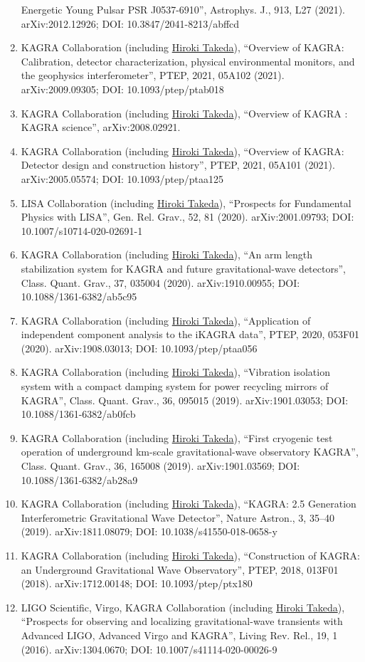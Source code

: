 \documentclass[uplatex, 11pt]{jsarticle}
\begin{document}
\begin{enumerate}
Energetic Young Pulsar PSR J0537-6910”, Astrophys. J., 913, L27 (2021). arXiv:2012.12926; DOI: 10.3847/2041-8213/abffcd
\item KAGRA Collaboration (including \uline{Hiroki Takeda}), “Overview of KAGRA: Calibration, detector characterization, physical environmental monitors, and the geophysics interferometer”, PTEP, 2021, 05A102 (2021). arXiv:2009.09305; DOI: 10.1093/ptep/ptab018
\item KAGRA Collaboration (including \uline{Hiroki Takeda}), “Overview of KAGRA : KAGRA science”, arXiv:2008.02921.
\item KAGRA Collaboration (including \uline{Hiroki Takeda}), “Overview of KAGRA: Detector design and construction history”, PTEP, 2021, 05A101 (2021). arXiv:2005.05574; DOI: 10.1093/ptep/ptaa125
\item LISA Collaboration (including \uline{Hiroki Takeda}), “Prospects for Fundamental Physics with LISA”, Gen. Rel. Grav., 52, 81 (2020). arXiv:2001.09793; DOI: 10.1007/s10714-020-02691-1
\item KAGRA Collaboration (including \uline{Hiroki Takeda}), “An arm length stabilization system for KAGRA and future gravitational-wave detectors”, Class. Quant. Grav., 37, 035004 (2020). arXiv:1910.00955; DOI: 10.1088/1361-6382/ab5c95
\item KAGRA Collaboration (including \uline{Hiroki Takeda}), “Application of independent component analysis to the iKAGRA data”, PTEP, 2020, 053F01 (2020). arXiv:1908.03013; DOI: 10.1093/ptep/ptaa056
\item KAGRA Collaboration (including \uline{Hiroki Takeda}), “Vibration isolation system with a compact damping system for power recycling mirrors of KAGRA”, Class. Quant. Grav., 36, 095015 (2019). arXiv:1901.03053; DOI: 10.1088/1361-6382/ab0fcb
\item KAGRA Collaboration (including \uline{Hiroki Takeda}), “First cryogenic test operation of underground km-scale gravitational-wave observatory KAGRA”, Class. Quant. Grav., 36, 165008 (2019). arXiv:1901.03569; DOI: 10.1088/1361-6382/ab28a9
\item KAGRA Collaboration (including \uline{Hiroki Takeda}), “KAGRA: 2.5 Generation Interferometric Gravitational Wave Detector”, Nature Astron., 3, 35--40 (2019). arXiv:1811.08079; DOI: 10.1038/s41550-018-0658-y
\item KAGRA Collaboration (including \uline{Hiroki Takeda}), “Construction of KAGRA: an Underground Gravitational Wave Observatory”, PTEP, 2018, 013F01 (2018). arXiv:1712.00148; DOI: 10.1093/ptep/ptx180
\item LIGO Scientific, Virgo, KAGRA Collaboration (including \uline{Hiroki Takeda}), “Prospects for observing and localizing gravitational-wave transients with Advanced LIGO, Advanced Virgo and KAGRA”, Living Rev. Rel., 19, 1 (2016). arXiv:1304.0670; DOI: 10.1007/s41114-020-00026-9
\end{enumerate}
\end{document}
